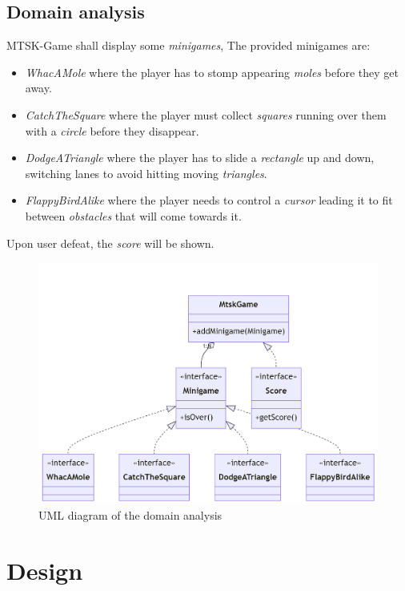 \documentclass[a4paper,12pt]{report}
\begin{document}
\section{Domain analysis}

MTSK-Game shall display some \textit{minigames},
The provided minigames are:
\begin{itemize} 
	\item \textit{WhacAMole} where the player has to stomp appearing \textit{moles} before they get away.
	\item \textit{CatchTheSquare} where the player must collect \textit{squares} running over them with a \textit{circle} before they disappear.
	\item \textit{DodgeATriangle} where the player has to slide a \textit{rectangle} up and down, switching lanes to avoid hitting moving \textit{triangles}.
	\item \textit{FlappyBirdAlike} where the player needs to control a \textit{cursor} leading it to fit between \textit{obstacles} that will come towards it.
\end{itemize}
Upon user defeat, the \textit{score} will be shown.

\begin{figure}[h]
	\centering{}
	\includegraphics[width=\textwidth]{res/mermaid-diagram-2022-12-24-032504.png}
	\caption{UML diagram of the domain analysis}
\end{figure}

\chapter{Design}
\end{document}
